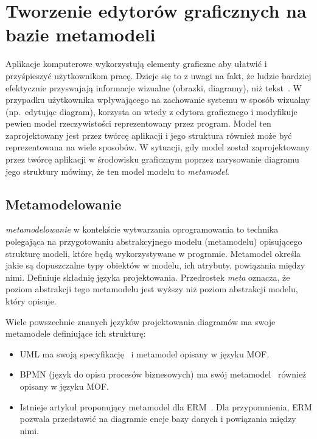 \chapter{Tworzenie edytorów graficznych na bazie metamodeli}

Aplikacje komputerowe wykorzystują elementy graficzne aby ułatwić i
przyśpieszyć użytkownikom pracę.
Dzieje się to z uwagi na fakt, że ludzie bardziej efektycznie przyswajają
informacje wizualne (obrazki, diagramy), niż
tekst~\cite{images-more-effective-article}.
W przypadku użytkownika
wpływającego na zachowanie systemu w sposób wizualny (np.\ edytując diagram),
korzysta on wtedy z edytora graficznego i modyfikuje pewien model
rzeczywistości reprezentowany przez program. Model ten zaprojektowany jest
przez twórcę aplikacji i jego struktura również może być reprezentowana na
wiele sposobów. W sytuacji, gdy model został zaprojektowany przez twórcę
aplikacji w środowisku graficznym poprzez narysowanie diagramu jego struktury
mówimy, że ten model modelu to \emph{metamodel}.

\section{Metamodelowanie}

\emph{\Gls{metamodelowanie}} w kontekście wytwarzania oprogramowania to
technika polegająca
na przygotowaniu abstrakcyjnego modelu (metamodelu) opisującego strukturę
modeli, które będą wykorzystywane w programie. Metamodel określa jakie są
dopuszczalne typy obiektów w modelu, ich atrybuty, powiązania między nimi.
Definiuje składnię języka projektowania. Przedrostek \emph{meta} oznacza, że
poziom abstrakcji tego metamodelu jest wyższy niż poziom abstrakcji modelu,
który opisuje.

Wiele powszechnie znanych języków projektowania diagramów ma swoje metamodele
definiujące ich strukturę:

\begin{itemize}
	\item \gls{UML} ma swoją specyfikację~\cite{uml-omg-specification} i
	      metamodel opisany w języku \gls{MOF}.

	\item \gls{BPMN} (język do opisu procesów biznesowych) ma swój
	      metamodel~\cite{bpmn2-metamodel} również opisany w języku \gls{MOF}.

	\item Istnieje artykuł proponujący metamodel dla \gls{ERM}~\cite{entity-relationship-metamodel}. Dla przypomnienia, \gls{ERM} pozwala przedstawić na diagramie encje bazy danych i powiązania między nimi.
\end{itemize}

